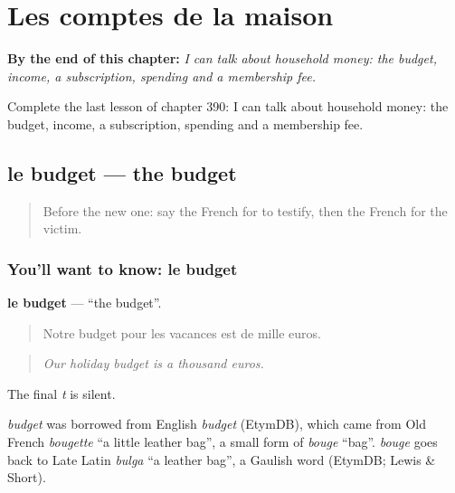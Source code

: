 
\chapter{Les comptes de la maison}
\label{ch:fr-les-comptes-de-la-maison}

\begin{chapteropening}
\textbf{By the end of this chapter:} \emph{I can talk about household money: the budget, income, a subscription, spending and a membership fee.}

Complete the last lesson of chapter 390: I can talk about household money: the budget, income, a subscription, spending and a membership fee.
\end{chapteropening}

\section[le budget]{le budget — the budget}

\label{lesson:FR-C390-budget}



\begin{quote}
Before the new one: say the French for to testify, then the French for the victim.
\end{quote}

\subsection*{You'll want to know: le budget}
\textbf{le budget} — \textquotedblleft{}the budget\textquotedblright{}.

\begin{quote}
Notre budget pour les vacances est de mille euros.
\end{quote}

\begin{quote}
\emph{Our holiday budget is a thousand euros.}
\end{quote}

The final \emph{t} is silent.

\begin{cousinweb}
\emph{budget} was borrowed from English \emph{budget} (EtymDB), which came from Old French \emph{bougette} \textquotedblleft{}a little leather bag\textquotedblright{}, a small form of \emph{bouge} \textquotedblleft{}bag\textquotedblright{}. \emph{bouge} goes back to Late Latin \emph{bulga} \textquotedblleft{}a leather bag\textquotedblright{}, a Gaulish word (EtymDB; Lewis \& Short).
\end{cousinweb}

